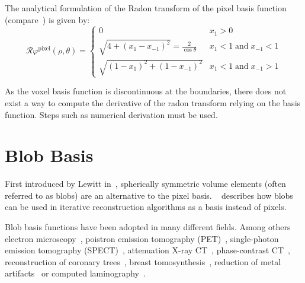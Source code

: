 The analytical formulation of the Radon transform of the pixel basis function
(compare~\cite{toft_radon_1996}) is given by:
\begin{equation}\label{eq:radon_voxel_basis}
	\mathscr{R}\varphi^{\text{pixel}}(\rho, \theta) =
	\begin{cases}
		0                                                  & x_1 > 0                         \\
		\sqrt{4 + (x_1 - x_{-1})^2} = \frac{2}{\cos\theta} & x_1 < 1\;\text{and}\;x_{-1} < 1 \\
		\sqrt{(1 - x_1)^2 + (1 - x_{-1})^2}                & x_1 < 1\;\text{and}\;x_{-1} > 1
	\end{cases}
\end{equation}

As the voxel basis function is discontinuous at the boundaries, there does not exist a way to
compute the derivative of the radon transform relying on the basis function. Steps such as numerical
derivation must be used.


\section{Blob Basis}\label{sec:blob_basis}

First introduced by Lewitt in~\cite{lewitt_multidimensional_1990}, spherically symmetric volume
elements (often referred to as blobs) are an alternative to the pixel basis.
~\cite{lewitt_alternatives_1992} describes how blobs can be used in iterative reconstruction
algorithms as a basis instead of pixels.

Blob basis functions have been adopted in many different fields. Among others electron
microscopy~\cite{marabini_3d_1998, garduno_optimization_2001}, poistron emission tomography
(PET)~\cite{jacobs_comparative_1999, chlewicki_noise_2004}, single-photon emission tomography
(SPECT)~\cite{wang_3d_2004, yendiki_comparison_2004}, attenuation X-ray
CT~\cite{jacobs_iterative_1999, carvalho_helical_2003, isola_motion-compensated_2008},
phase-contrast CT~\cite{kohler_iterative_2011, xu_investigation_2012}, reconstruction of coronary
trees~\cite{zhou_blob-based_2008}, breast tomosynthesis~\cite{wu_breast_2010}, reduction of metal
artifacts~\cite{levakhina_two-step_2010} or computed laminography~\cite{trampert_spherically_2017}.


